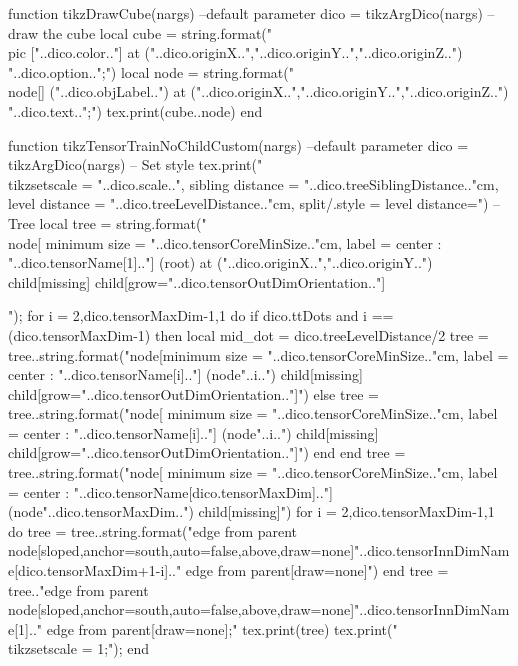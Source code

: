 \begin{luacode*}
{{	function tikzDrawCube(nargs)
		--default parameter
		dico = tikzArgDico(nargs)
		--draw the cube
		local cube = string.format("\\pic ["..dico.color.."] at ("..dico.originX..","..dico.originY..","..dico.originZ..") {"..dico.option.."};")
		local node = string.format("\\node[] ("..dico.objLabel..") at ("..dico.originX..","..dico.originY..","..dico.originZ..") {"..dico.text.."};")
		tex.print(cube..node)
	end

	function tikzTensorTrainNoChildCustom(nargs)
		--default parameter
		dico = tikzArgDico(nargs)
		-- Set style
		tex.print("\\tikzset{scale = "..dico.scale..", sibling distance = "..dico.treeSiblingDistance.."cm, level distance = "..dico.treeLevelDistance.."cm, split/.style = {level distance=}}")
		-- Tree
		local tree = string.format("\\node[ minimum size = "..dico.tensorCoreMinSize.."cm, label = center : "..dico.tensorName[1].."] (root) at ("..dico.originX..","..dico.originY..") {} child[missing] child[grow="..dico.tensorOutDimOrientation.."]{");
		for i = 2,dico.tensorMaxDim-1,1 do
		   	if dico.ttDots and i == (dico.tensorMaxDim-1) then
				local mid_dot = dico.treeLevelDistance/2
			   tree = tree..string.format("node[minimum size = "..dico.tensorCoreMinSize.."cm, label = center : "..dico.tensorName[i].."] (node"..i..") {} child[missing] child[grow="..dico.tensorOutDimOrientation.."]{")
		   	else
		   		tree = tree..string.format("node[  minimum size = "..dico.tensorCoreMinSize.."cm, label = center : "..dico.tensorName[i].."] (node"..i..") {} child[missing] child[grow="..dico.tensorOutDimOrientation.."]{")
			end
		end
		tree = tree..string.format("node[  minimum size = "..dico.tensorCoreMinSize.."cm, label = center : "..dico.tensorName[dico.tensorMaxDim].."] (node"..dico.tensorMaxDim..") {} child[missing]")
		for i = 2,dico.tensorMaxDim-1,1 do
		  tree = tree..string.format("edge from parent node[sloped,anchor=south,auto=false,above,draw=none]{"..dico.tensorInnDimName[dico.tensorMaxDim+1-i].."} edge from parent[draw=none]}")
		end
		tree = tree.."edge from parent node[sloped,anchor=south,auto=false,above,draw=none]{"..dico.tensorInnDimName[1].."} edge from parent[draw=none]};"
		tex.print(tree)
		tex.print("\\tikzset{scale = 1};");
	end

}}}
\end{luacode*}
